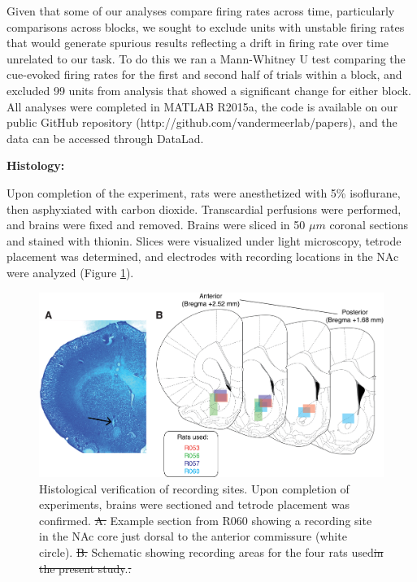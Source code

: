 \documentclass[11pt]{article}
\newcommand{\bsf}[1]{\textbf{#1}}
\providecommand{\DIFadd}[1]{{\protect\color{blue}\uwave{#1}}} %
\providecommand{\DIFdel}[1]{{\protect\color{red}\sout{#1}}}                      %
\providecommand{\DIFaddFL}[1]{\DIFadd{#1}} %
\providecommand{\DIFdelFL}[1]{\DIFdel{#1}} %
\providecommand{\DIFaddbeginFL}{} %
\providecommand{\DIFaddendFL}{} %
\providecommand{\DIFdelbeginFL}{} %
\providecommand{\DIFdelendFL}{} %
\newcommand{\DIFscaledelfig}{0.5}
\newlength{\DIFdelgraphicswidth} %
\newlength{\DIFdelgraphicsheight} %
\newcommand{\DIFaddincludegraphics}[2][]{{\color{blue}\fbox{\DIFOincludegraphics[#1]{#2}}}} %
\newcommand{\DIFdelincludegraphics}[2][]{%
\sbox{\DIFdelgraphicsbox}{\DIFOincludegraphics[#1]{#2}}%
\settoboxwidth{\DIFdelgraphicswidth}{\DIFdelgraphicsbox} %
\settoboxtotalheight{\DIFdelgraphicsheight}{\DIFdelgraphicsbox} %
\scalebox{\DIFscaledelfig}{%
\parbox[b]{\DIFdelgraphicswidth}{\usebox{\DIFdelgraphicsbox}\\[-\baselineskip] \rule{\DIFdelgraphicswidth}{0em}}\llap{\resizebox{\DIFdelgraphicswidth}{\DIFdelgraphicsheight}{%
\setlength{\unitlength}{\DIFdelgraphicswidth}%
\begin{picture}(1,1)%
\thicklines\linethickness{2pt} %
{\color[rgb]{1,0,0}\put(0,0){\framebox(1,1){}}}%
{\color[rgb]{1,0,0}\put(0,0){\line( 1,1){1}}}%
{\color[rgb]{1,0,0}\put(0,1){\line(1,-1){1}}}%
\end{picture}%
}\hspace*{3pt}}} %
} %
\DeclareRobustCommand{\DIFaddbeginFL}{\DIFOaddbeginFL \let\includegraphics\DIFaddincludegraphics} %
\DeclareRobustCommand{\DIFaddendFL}{\DIFOaddendFL \let\includegraphics\DIFOincludegraphics} %
\DeclareRobustCommand{\DIFdelbeginFL}{\DIFOdelbeginFL \let\includegraphics\DIFdelincludegraphics} %
\DeclareRobustCommand{\DIFdelendFL}{\DIFOaddendFL \let\includegraphics\DIFOincludegraphics} %
\begin{document}
{Given that some of our analyses compare firing rates across time, particularly
comparisons across blocks, we sought to exclude units with unstable firing rates
that would generate spurious results reflecting a drift in firing rate over time
unrelated to our task. To do this we ran a Mann-Whitney U test comparing the
cue-evoked firing rates for the first and second half of trials within a block,
and excluded 99 units from analysis that showed a significant change for either
block. All analyses were completed in MATLAB R2015a, the code is available on
our public GitHub repository (http://github.com/vandermeerlab/papers), and the
data can be accessed through DataLad.

{\bf Histology:}

Upon completion of the experiment, rats were anesthetized with 5\% isoflurane,
then asphyxiated with carbon dioxide. Transcardial perfusions were performed,
and brains were fixed and removed. Brains were sliced in 50 $\mu m$ coronal
sections and stained with thionin. Slices were visualized under light
microscopy, tetrode placement was determined, and electrodes with recording
locations in the NAc were analyzed (Figure \ref{fig:histo}).

\begin{figure}[h]
\centering
\includegraphics[width=\textwidth]{Fig 3 - Histology.png}
\caption{Histological verification of recording sites. Upon completion of
  experiments, brains were sectioned and tetrode placement was
  confirmed. \DIFdelbeginFL \DIFdelFL{A. }\DIFdelendFL \DIFaddbeginFL \DIFaddFL{\bsf{A}: }\DIFaddendFL Example section from R060 showing a recording site in the
  NAc core just dorsal to the anterior commissure (white circle). \DIFdelbeginFL \DIFdelFL{B. }\DIFdelendFL \DIFaddbeginFL \DIFaddFL{\bsf{B}:
  }\DIFaddendFL Schematic showing recording areas for the four rats used\DIFdelbeginFL \DIFdelFL{in the present study}\DIFdelendFL .\DIFdelbeginFL \DIFdelFL{.}\DIFdelendFL }
\label{fig:histo}
\end{figure}
}
\end{document}
